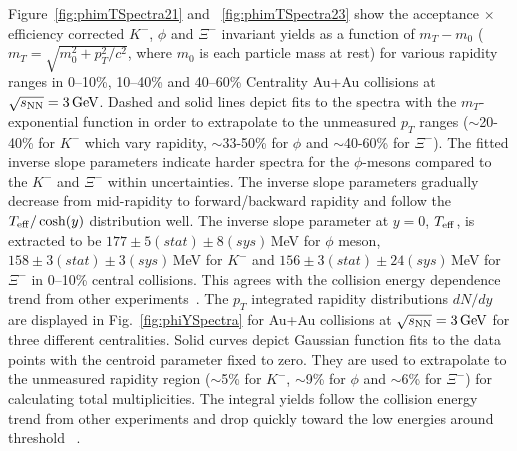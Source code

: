 \documentclass[aps,tightenlines,superscriptaddress,twocolumn]{revtex4-1}
\begin{document}
Figure~\ref{fig:phimTSpectra21} and ~\ref{fig:phimTSpectra23} show the acceptance $\times$ efficiency corrected $K^-$, $\phi$ and $\Xi^-$ invariant yields as a function of $m_T-m_0$ ($m_T = \sqrt{m_{0}^{2}+p_{T}^2/c^{2}}$, where $m_0$ is each particle mass at rest) for various rapidity ranges in 0--10\%, 10--40\% and 40--60\% Centrality Au+Au collisions at ${\sqrt{s_{\rm NN}} = \rm{3\,GeV}}$. 
Dashed and solid lines depict fits to the spectra with the $m_T$-exponential function in order to extrapolate to the unmeasured $p_T$ ranges ($\sim$20-40\% for $K^-$ which vary rapidity, $\sim$33-50\% for $\phi$ and $\sim$40-60\% for $\Xi^-$). 
The fitted inverse slope parameters indicate harder spectra for the $\phi$-mesons compared to the $K^-$ and $\Xi^-$ within uncertainties. The inverse slope parameters gradually decrease from mid-rapidity to forward/backward rapidity and follow the $T_{\rm eff}/\cosh(y)$ distribution well. The inverse slope parameter at $y=0$, $T_{\rm eff}$, is extracted to be $177\pm5 (stat)\pm8 (sys)$\,MeV for $\phi$ meson, $158\pm3 (stat)\pm3 (sys)$\,MeV for $K^{-}$ and $156\pm3 (stat)\pm24 (sys)$\,MeV for $\Xi^{-}$ in 0--10\% central collisions. This agrees with the collision energy dependence trend from other experiments~\cite{NA49_phi:2008,HADES_phi_AuAu:2018}.
The $p_T$ integrated rapidity distributions $dN/dy$ are displayed in Fig.~\ref{fig:phiYSpectra} for Au+Au collisions at ${\sqrt{s_{\rm NN}} = \rm{3\,GeV}}$ for three different centralities. 
Solid curves depict Gaussian function fits to the data points with the centroid parameter fixed to zero. They are used to extrapolate to the unmeasured rapidity region ($\sim$5\% for $K^-$, $\sim$9\% for $\phi$ and $\sim$6\% for $\Xi^-$) for calculating total multiplicities. 
The integral yields follow the collision energy trend from other experiments and drop quickly toward the low energies around threshold  ~\cite{NA49_phi:2008,HADES_phi_ArKCl:2009,FOPI_phi_NiNi:2015,FOPI_phi_AlAl:2016,HADES_phi_AuAu:2018}.

\end{document}
